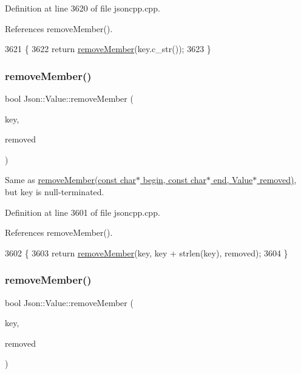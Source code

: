 Definition at line 3620 of file jsoncpp.\+cpp.



References remove\+Member().


\begin{DoxyCode}
3621 \{
3622   \textcolor{keywordflow}{return} \hyperlink{class_json_1_1_value_aa52f7873b95d29627d6e83ba96f69aaa}{removeMember}(key.c\_str());
3623 \}
\end{DoxyCode}
\mbox{\label{class_json_1_1_value_a708e599489adf30d65bf85a8ee16e6fb}} 
\subsubsection{\texorpdfstring{remove\+Member()}{removeMember()}\hspace{0.1cm}{\footnotesize\ttfamily [3/5]}}
{\footnotesize\ttfamily bool Json\+::\+Value\+::remove\+Member (\begin{DoxyParamCaption}\item[{const char $\ast$}]{key,  }\item[{\hyperlink{class_json_1_1_value}{Value} $\ast$}]{removed }\end{DoxyParamCaption})}

Same as \hyperlink{class_json_1_1_value_a49c91af727d6b4eb0af02a81bb2def87}{remove\+Member(const char$\ast$ begin, const char$\ast$ end, Value$\ast$ removed)}, but \textquotesingle{}key\textquotesingle{} is null-\/terminated. 

Definition at line 3601 of file jsoncpp.\+cpp.



References remove\+Member().


\begin{DoxyCode}
3602 \{
3603   \textcolor{keywordflow}{return} \hyperlink{class_json_1_1_value_aa52f7873b95d29627d6e83ba96f69aaa}{removeMember}(key, key + strlen(key), removed);
3604 \}
\end{DoxyCode}
\mbox{\label{class_json_1_1_value_ae385ecef98427970df525ee876e9f54a}} 
\subsubsection{\texorpdfstring{remove\+Member()}{removeMember()}\hspace{0.1cm}{\footnotesize\ttfamily [4/5]}}
{\footnotesize\ttfamily bool Json\+::\+Value\+::remove\+Member (\begin{DoxyParamCaption}\item[{\hyperlink{json_8h_a1e723f95759de062585bc4a8fd3fa4be}{J\+S\+O\+N\+C\+P\+P\+\_\+\+S\+T\+R\+I\+NG} const \&}]{key,  }\item[{\hyperlink{class_json_1_1_value}{Value} $\ast$}]{removed }\end{DoxyParamCaption})}



